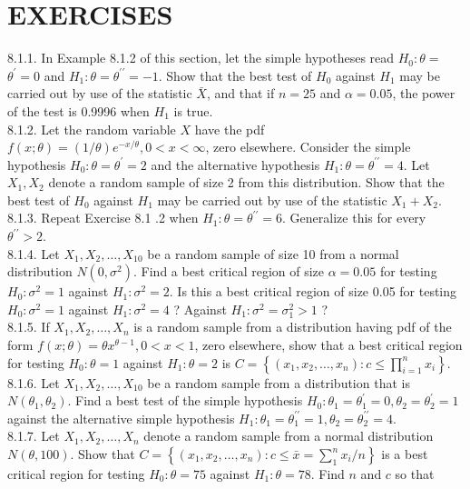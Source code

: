 \section*{EXERCISES}
8.1.1. In Example 8.1.2 of this section, let the simple hypotheses read $H_{0}: \theta=$ $\theta^{\prime}=0$ and $H_{1}: \theta=\theta^{\prime \prime}=-1$. Show that the best test of $H_{0}$ against $H_{1}$ may be carried out by use of the statistic $\bar{X}$, and that if $n=25$ and $\alpha=0.05$, the power of the test is 0.9996 when $H_{1}$ is true.\\
8.1.2. Let the random variable $X$ have the pdf $f(x ; \theta)=(1 / \theta) e^{-x / \theta}, 0<x<\infty$, zero elsewhere. Consider the simple hypothesis $H_{0}: \theta=\theta^{\prime}=2$ and the alternative hypothesis $H_{1}: \theta=\theta^{\prime \prime}=4$. Let $X_{1}, X_{2}$ denote a random sample of size 2 from this distribution. Show that the best test of $H_{0}$ against $H_{1}$ may be carried out by use of the statistic $X_{1}+X_{2}$.\\
8.1.3. Repeat Exercise 8.1 .2 when $H_{1}: \theta=\theta^{\prime \prime}=6$. Generalize this for every $\theta^{\prime \prime}>2$.\\
8.1.4. Let $X_{1}, X_{2}, \ldots, X_{10}$ be a random sample of size 10 from a normal distribution $N\left(0, \sigma^{2}\right)$. Find a best critical region of size $\alpha=0.05$ for testing $H_{0}: \sigma^{2}=1$ against $H_{1}: \sigma^{2}=2$. Is this a best critical region of size 0.05 for testing $H_{0}: \sigma^{2}=1$ against $H_{1}: \sigma^{2}=4$ ? Against $H_{1}: \sigma^{2}=\sigma_{1}^{2}>1$ ?\\
8.1.5. If $X_{1}, X_{2}, \ldots, X_{n}$ is a random sample from a distribution having pdf of the form $f(x ; \theta)=\theta x^{\theta-1}, 0<x<1$, zero elsewhere, show that a best critical region for testing $H_{0}: \theta=1$ against $H_{1}: \theta=2$ is $C=\left\{\left(x_{1}, x_{2}, \ldots, x_{n}\right): c \leq \prod_{i=1}^{n} x_{i}\right\}$.\\
8.1.6. Let $X_{1}, X_{2}, \ldots, X_{10}$ be a random sample from a distribution that is $N\left(\theta_{1}, \theta_{2}\right)$. Find a best test of the simple hypothesis $H_{0}: \theta_{1}=\theta_{1}^{\prime}=0, \theta_{2}=\theta_{2}^{\prime}=1$ against the alternative simple hypothesis $H_{1}: \theta_{1}=\theta_{1}^{\prime \prime}=1, \theta_{2}=\theta_{2}^{\prime \prime}=4$.\\
8.1.7. Let $X_{1}, X_{2}, \ldots, X_{n}$ denote a random sample from a normal distribution $N(\theta, 100)$. Show that $C=\left\{\left(x_{1}, x_{2}, \ldots, x_{n}\right): c \leq \bar{x}=\sum_{1}^{n} x_{i} / n\right\}$ is a best critical region for testing $H_{0}: \theta=75$ against $H_{1}: \theta=78$. Find $n$ and $c$ so that

